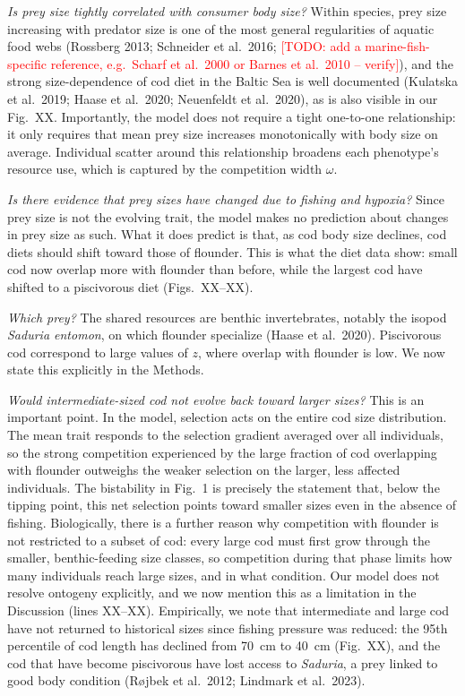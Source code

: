 \documentclass[11pt]{article}
\newcommand{\todo}[1]{\textcolor{red}{[TODO: #1]}}
\begin{document}
\textit{Is prey size tightly correlated with consumer body size?} Within species, prey size increasing with predator size is one of the most general regularities of aquatic food webs (Rossberg 2013; Schneider et al.\ 2016; \todo{add a marine-fish-specific reference, e.g.\ Scharf et al.\ 2000 or Barnes et al.\ 2010 -- verify}), and the strong size-dependence of cod diet in the Baltic Sea is well documented (Kulatska et al.\ 2019; Haase et al.\ 2020; Neuenfeldt et al.\ 2020), as is also visible in our Fig.~XX. Importantly, the model does not require a tight one-to-one relationship: it only requires that mean prey size increases monotonically with body size on average. Individual scatter around this relationship broadens each phenotype's resource use, which is captured by the competition width $\omega$.

\textit{Is there evidence that prey sizes have changed due to fishing and hypoxia?} Since prey size is not the evolving trait, the model makes no prediction about changes in prey size as such. What it does predict is that, as cod body size declines, cod diets should shift toward those of flounder. This is what the diet data show: small cod now overlap more with flounder than before, while the largest cod have shifted to a piscivorous diet (Figs.~XX--XX).

\textit{Which prey?} The shared resources are benthic invertebrates, notably the isopod \textit{Saduria entomon}, on which flounder specialize (Haase et al.\ 2020). Piscivorous cod correspond to large values of $z$, where overlap with flounder is low. We now state this explicitly in the Methods.

\textit{Would intermediate-sized cod not evolve back toward larger sizes?} This is an important point. In the model, selection acts on the entire cod size distribution. The mean trait responds to the selection gradient averaged over all individuals, so the strong competition experienced by the large fraction of cod overlapping with flounder outweighs the weaker selection on the larger, less affected individuals. The bistability in Fig.~1 is precisely the statement that, below the tipping point, this net selection points toward smaller sizes even in the absence of fishing. Biologically, there is a further reason why competition with flounder is not restricted to a subset of cod: every large cod must first grow through the smaller, benthic-feeding size classes, so competition during that phase limits how many individuals reach large sizes, and in what condition. Our model does not resolve ontogeny explicitly, and we now mention this as a limitation in the Discussion (lines XX--XX). Empirically, we note that intermediate and large cod have not returned to historical sizes since fishing pressure was reduced: the 95th percentile of cod length has declined from 70~cm to 40~cm (Fig.~XX), and the cod that have become piscivorous have lost access to \textit{Saduria}, a prey linked to good body condition (Røjbek et al.\ 2012; Lindmark et al.\ 2023).
\end{document}
